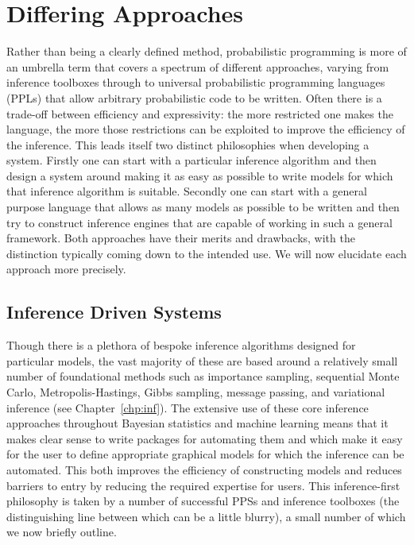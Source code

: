 
\section{Differing Approaches}
\label{sec:probprog:two}

Rather than being a clearly defined method,
probabilistic programming is more of an umbrella term that covers a spectrum of 
different approaches, varying from inference toolboxes through to universal probabilistic programming
languages (PPLs) that allow
arbitrary probabilistic code to be written.
Often there is a trade-off between efficiency and expressivity: the more restricted
one makes the language, the more those restrictions can be exploited to improve the efficiency
of the inference.  This leads itself two distinct philosophies when developing a system. 
Firstly one can start with a particular inference algorithm and then design a system around making it as
easy as possible to write models for which that inference algorithm is suitable.  Secondly one can start
with  a general purpose language that allows as many models as possible to be written and then try to construct
inference engines that are capable of working in such a general framework.  Both approaches 
have their merits and drawbacks, with the distinction typically coming down to the intended use.
We will now elucidate each approach more precisely.  

\subsection{Inference Driven Systems}
\label{sec:probprog:two:inf}

Though there is a plethora of bespoke inference algorithms designed for particular models, the vast majority of these are based around
a relatively small number of foundational methods such as importance sampling, sequential Monte Carlo,
Metropolis-Hastings, Gibbs sampling, message passing, and variational inference (see Chapter~\ref{chp:inf}).
The extensive use of these core inference approaches throughout Bayesian statistics and machine
learning means that it makes clear sense to write packages for automating them and which
make it easy for the user to define appropriate graphical models for which the inference can be automated.
This both improves the efficiency of constructing models and reduces barriers to entry by reducing the
required expertise for users.  This inference-first philosophy is taken by a number of successful PPSs
and inference toolboxes (the distinguishing line between which can be a little blurry), a small number of which we now 
briefly outline.

